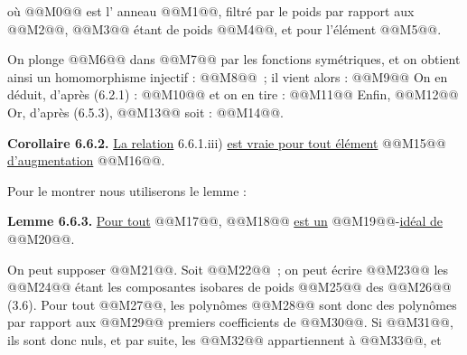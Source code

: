 
où @@M0@@ est l'%
anneau @@M1@@, filtré par le poids par rapport aux @@M2@@, @@M3@@ étant de poids @@M4@@, et pour l'élément @@M5@@.

On plonge @@M6@@ dans @@M7@@ par les fonctions symétriques, et on obtient ainsi un homomorphisme injectif : @@M8@@~; il vient alors :
@@M9@@
On en déduit, d'après (6.2.1) :
@@M10@@
et on en tire :
@@M11@@
Enfin,
@@M12@@
Or, d'après (6.5.3), @@M13@@
soit : @@M14@@.

\textbf{Corollaire 6.6.2.} \uline{La relation} 6.6.1.iii) \uline{est vraie pour tout élément} @@M15@@ \uline{d'augmentation} @@M16@@.

Pour le montrer nous utiliserons le lemme :

\textbf{Lemme 6.6.3.} \uline{Pour tout} @@M17@@, @@M18@@ \uline{est un} @@M19@@-\uline{idéal de} @@M20@@.

On peut supposer @@M21@@. Soit @@M22@@~; on peut écrire @@M23@@ les @@M24@@ étant les composantes isobares de poids @@M25@@ des @@M26@@ (3.6). Pour tout @@M27@@, les polynômes @@M28@@ sont donc des polynômes par rapport aux @@M29@@ premiers coefficients de @@M30@@. Si @@M31@@, ils sont donc nuls, et par suite, les @@M32@@ appartiennent à @@M33@@, et 
